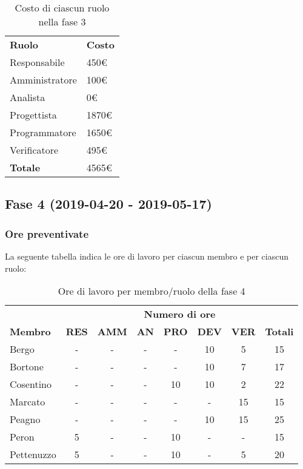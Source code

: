 		\begin{table}[h]
			\centering
			\begin{tabular}{| l | l |}
				\rowcolor{LightBlue}
				\textbf{\color{white}Ruolo}
				& \textbf{\color{white}Costo}\\
				
				Responsabile 		& 450€\\
				Amministratore 	& 100€\\
				Analista 				& 0€\\			
				Progettista 			& 1870€\\
				Programmatore 		& 1650€\\
				Verificatore 		& 495€\\ \hline
				\textbf{Totale} 	& 4565€\\ \hline
			\end{tabular}
			\caption{Costo di ciascun ruolo nella fase 3}
		\end{table}
		
\newpage
\subsection{Fase 4 (2019-04-20 - 2019-05-17)}
	\subsubsection{Ore preventivate}
		La seguente tabella indica le ore di lavoro per ciascun membro e per ciascun ruolo:
		\begin{table}[h]
			\centering
			\begin{tabular}{| l | c c c c c c | c |}
				\rowcolor{LightBlue}
				& \multicolumn{7}{c}{\textbf{\color{white}Numero di ore}}	\\
		
				\rowcolor{LightBlue}
				\textbf{\color{white}Membro}
				& \textbf{\color{white}RES}
				& \textbf{\color{white}AMM}
				& \textbf{\color{white}AN}
				& \textbf{\color{white}PRO}
				& \textbf{\color{white}DEV}
				& \textbf{\color{white}VER}
				& \textbf{\color{white}Totali}\\
	
				Bergo      & - & - & - & - & 10 & 5 & 15\\
				Bortone    & - & - & - & - & 10 & 7 & 17\\
				Cosentino  & - & - & - & 10 & 10 & 2 & 22\\
				Marcato    & - & - & - & - & - & 15 & 15\\
				Peagno     & - & - & - & - & 10 & 15 & 25\\
				Peron      & 5 & - & - & 10 & - & - & 15\\
				Pettenuzzo & 5 & - & - & 10 & - & 5 & 20\\ \hline
			\end{tabular}
			\caption{Ore di lavoro per membro/ruolo della fase 4}
		\end{table}
		

